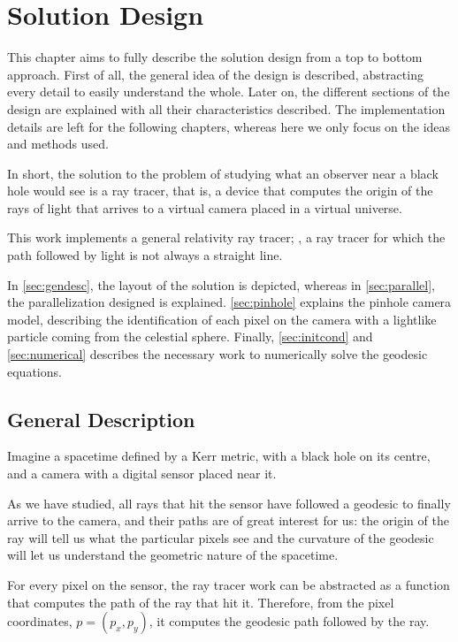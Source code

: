 \chapter{Solution Design}

This chapter aims to fully describe the solution design from a top to bottom approach. First of all, the general idea of the design is described, abstracting every detail to easily understand the whole. Later on, the different sections of the design are explained with all their characteristics described. The implementation details are left for the following chapters, whereas here we only focus on the ideas and methods used.

In short, the solution to the problem of studying what an observer near a black hole would see is a ray tracer, that is, a device that computes the origin of the rays of light that arrives to a virtual camera placed in a virtual universe.

This work implements a general relativity ray tracer; \ie, a ray tracer for which the path followed by light is not always a straight line.

In \autoref{sec:gendesc}, the layout of the solution is depicted, whereas in \autoref{sec:parallel}, the parallelization designed is explained. \autoref{sec:pinhole} explains the pinhole camera model, describing the identification of each pixel on the camera with a lightlike particle coming from the celestial sphere. Finally, \autoref{sec:initcond} and \autoref{sec:numerical} describes the necessary work to numerically solve the geodesic equations.

\section{General Description}
\label{sec:gendesc}

Imagine a spacetime defined by a Kerr metric, with a black hole on its centre, and a camera with a digital sensor placed near it.

As we have studied, all rays that hit the sensor have followed a geodesic to finally arrive to the camera, and their paths are of great interest for us: the origin of the ray will tell us what the particular pixels see and the curvature of the geodesic will let us understand the geometric nature of the spacetime.

For every pixel on the sensor, the ray tracer work can be abstracted as a function that computes the path of the ray that hit it. Therefore, from the pixel coordinates, $p = (p_x, p_y)$, it computes the geodesic path followed by the ray.

